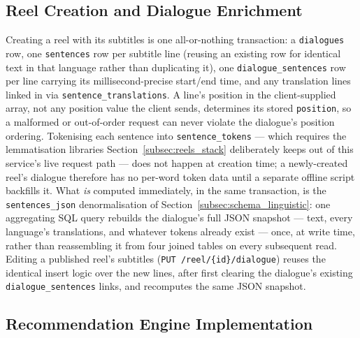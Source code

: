     \subsection{Reel Creation and Dialogue Enrichment}
    \label{subsec:reel_creation_impl}
    \begin{sloppypar}
    Creating a reel with its subtitles is one all-or-nothing transaction: a \texttt{dialogues} row, one \texttt{sentences} row per subtitle line (reusing an existing row for identical text in that language rather than duplicating it), one \texttt{dialogue\_sentences} row per line carrying its millisecond-precise start/end time, and any translation lines linked in via \texttt{sentence\_translations}. A line's position in the client-supplied array, not any position value the client sends, determines its stored \texttt{position}, so a malformed or out-of-order request can never violate the dialogue's position ordering. Tokenising each sentence into \texttt{sentence\_tokens} --- which requires the lemmatisation libraries Section~\ref{subsec:reels_stack} deliberately keeps out of this service's live request path --- does not happen at creation time; a newly-created reel's dialogue therefore has no per-word token data until a separate offline script backfills it. What \emph{is} computed immediately, in the same transaction, is the \texttt{sentences\_json} denormalisation of Section~\ref{subsec:schema_linguistic}: one aggregating SQL query rebuilds the dialogue's full JSON snapshot --- text, every language's translations, and whatever tokens already exist --- once, at write time, rather than reassembling it from four joined tables on every subsequent read. Editing a published reel's subtitles (\texttt{PUT /reel/\{id\}/dialogue}) reuses the identical insert logic over the new lines, after first clearing the dialogue's existing \texttt{dialogue\_sentences} links, and recomputes the same JSON snapshot.
    \end{sloppypar}

    \subsection{Recommendation Engine Implementation}
    \label{subsec:recommendation_impl}
